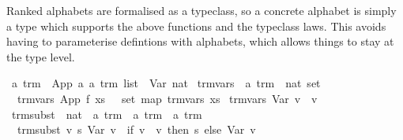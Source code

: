 \begin{isabellebody}
\begin{isamarkuptext}
Ranked alphabets are formalised as a typeclass, so a concrete alphabet
is simply a type which supports the above functions and the typeclass
laws. This avoids having to parameterise defintions with alphabets,
which allows things to stay at the type level.%
\end{isamarkuptext}%
\isamarkuptrue%
%
\isamarkuptrue%
\isamarkupfalse%
\ {}a\ trm\ {}\ App\ {}a\ {}{}a\ trm\ list{}\ {}\ Var\ nat\isanewline
\isanewline
{}\isamarkupfalse%
\ trm{}vars\ {}{}\ {}{}a\ trm\ {}\ nat\ set{}\ \isanewline
\ \ {}trm{}vars\ {}App\ f\ xs{}\ {}\ {}\ {}set\ {}map\ trm{}vars\ xs{}{}{}\isanewline
{}\ {}trm{}vars\ {}Var\ v{}\ {}\ {}v{}{}\isanewline
\isanewline
{}\isamarkupfalse%
\ trm{}subst\ {}{}\ {}nat\ {}\ {}a\ trm\ {}\ {}a\ trm\ {}\ {}a\ trm{}\ \isanewline
\ \ {}trm{}subst\ v\ s\ {}Var\ v{}{}\ {}\ {}if\ v{}\ {}\ v\ then\ s\ else\ Var\ v{}{}{}\isanewline

\end{isabellebody}
